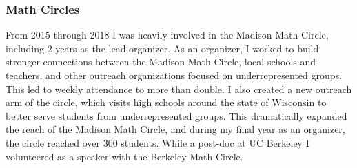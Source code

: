 \documentclass[11pt,reqno]{amsart}
\theoremstyle{remark}
\newcommand{\Spec}{\operatorname{Spec}}
\newcommand{\Q}{\mathbb{Q}}
\begin{document}


\subsubsection{Math Circles}
	From 2015 through 2018 I was heavily involved in the Madison Math Circle, including  2 years as the lead organizer. As an organizer, I worked to build stronger connections between the Madison Math Circle, local schools and teachers, and other outreach organizations focused on underrepresented groups. This led to weekly attendance to more than double. I also created a new outreach arm of the circle, which visits high schools around the state of Wisconsin to better serve students from underrepresented groups. This dramatically expanded the reach of the Madison Math Circle, and during my final year as an organizer, the circle reached over 300 students. While a post-doc at UC Berkeley I volunteered as a speaker with the Berkeley Math Circle. 
\end{document}
